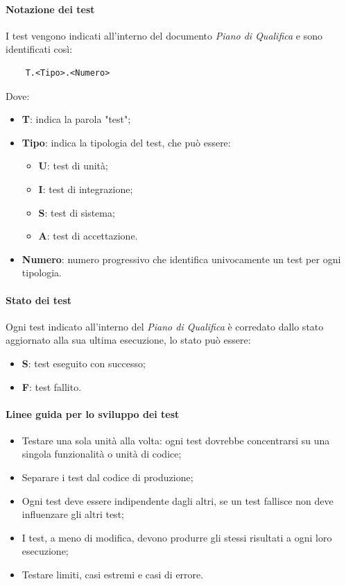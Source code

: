 \paragraph{Notazione dei test}
I test vengono indicati all'interno del documento \textit{Piano di Qualifica} e sono identificati così:
\begin{lstlisting}
    T.<Tipo>.<Numero>
\end{lstlisting} 
Dove:
\begin{itemize}
    \item \textbf{T}: indica la parola "test";
    \item \textbf{Tipo}: indica la tipologia del test, che può essere:
    \begin{itemize}
        \item \textbf{U}: test di unità;
        \item \textbf{I}: test di integrazione;
        \item \textbf{S}: test di sistema;
        \item \textbf{A}: test di accettazione.
    \end{itemize}
    \item \textbf{Numero}: numero progressivo che identifica univocamente un test per ogni tipologia.
\end{itemize}

\paragraph{Stato dei test}
Ogni test indicato all'interno del \textit{Piano di Qualifica} è corredato dallo stato aggiornato alla sua ultima esecuzione, lo stato può essere:
\begin{itemize}
    \item \textbf{S}: test eseguito con successo;
    \item \textbf{F}: test fallito.
\end{itemize}

\paragraph{Linee guida per lo sviluppo dei test}
\begin{itemize}
    \item Testare una sola unità alla volta: ogni test dovrebbe concentrarsi su una singola funzionalità o unità di codice;
    \item Separare i test dal codice di produzione;
    \item Ogni test deve essere indipendente dagli altri, se un test fallisce non deve influenzare gli altri test;
    \item I test, a meno di modifica, devono produrre gli stessi risultati a ogni loro esecuzione;
    \item Testare limiti, casi estremi e casi di errore.
\end{itemize}

